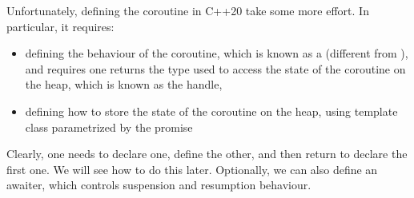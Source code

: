 Unfortunately, defining the coroutine in C++20 take some more effort. In particular, it requires:
\begin{itemize}
\item defining the behaviour of the coroutine, which is known as a  (different from ), and requires one returns the type used to access the state of the coroutine on the heap, which is known as the handle,  
\item defining how to store the state of the coroutine on the heap, using template class  parametrized by the promise
\end{itemize}
Clearly, one needs to declare one, define the other, and then return to declare the first one. We will see how to do this later.
Optionally, we can also define an awaiter, which controls suspension and resumption behaviour.

